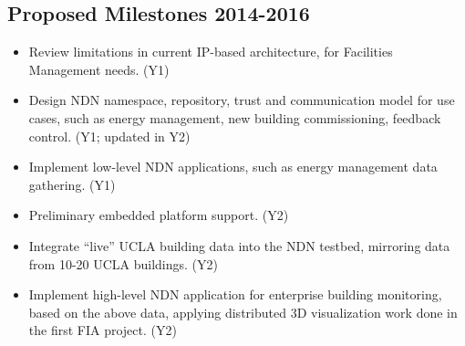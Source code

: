 \subsection{Proposed Milestones 2014-2016}

\begin{itemize}
\item Review limitations in current IP-based architecture, for Facilities Management needs. (Y1)
\item Design NDN namespace, repository, trust and communication model for use cases, such as energy management, new building commissioning, feedback control. (Y1; updated in Y2)
\item Implement low-level NDN applications, such as energy management data gathering. (Y1)
\item Preliminary embedded platform support. (Y2)
\item Integrate “live” UCLA building data into the NDN testbed, mirroring data from 10-20 UCLA buildings. (Y2)
\item Implement high-level NDN application for enterprise building monitoring, based on the above data, applying distributed 3D visualization work done in the first FIA project. (Y2)
\end{itemize}


